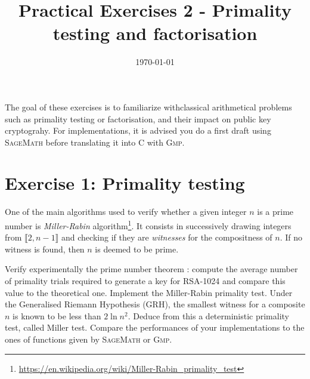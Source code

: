 \documentclass[english,a4paper,11pt]{exam}
\title{\textbf{Practical Exercises 2 - Primality testing and factorisation}}
\date{\today}
\begin{document}
\maketitle

The goal of these exercises is to familiarize withclassical  arithmetical problems
such as primality testing or factorisation, and their impact on public key
cryptograhy. For implementations, it is advised you do a first draft using
\textsc{SageMath} before translating it into
C with \textsc{Gmp}.





\section*{Exercise 1: Primality testing}

One of the main algorithms used to verify whether a given integer \(n\) is a prime
number is \emph{Miller-Rabin} algorithm\footnote{\url{https://en.wikipedia.org/wiki/Miller-Rabin_primality_test}}. It consists in successively drawing integers from
\(\llbracket 2, n-1 \rrbracket \) and checking if they are \emph{witnesses} for the
compositness of \(n\). If no witness is found, then \(n\) is deemed to be prime.

\begin{questions}
  \question Verify experimentally the prime number theorem : compute the average number
  of primality trials required to generate a key for RSA-1024 and compare this value
  to the theoretical one.
  \question Implement the Miller-Rabin primality test.
  \question Under the Generalised Riemann Hypothesis (GRH), the smallest witness
  for a composite \(n\) is known to be less than \(2 \ln n^2\). Deduce from this
  a deterministic primality test, called Miller test.
  \question Compare the performances of your implementations to the ones of
  functions given by \textsc{SageMath} or \textsc{Gmp}.
\end{questions}
\end{document}
